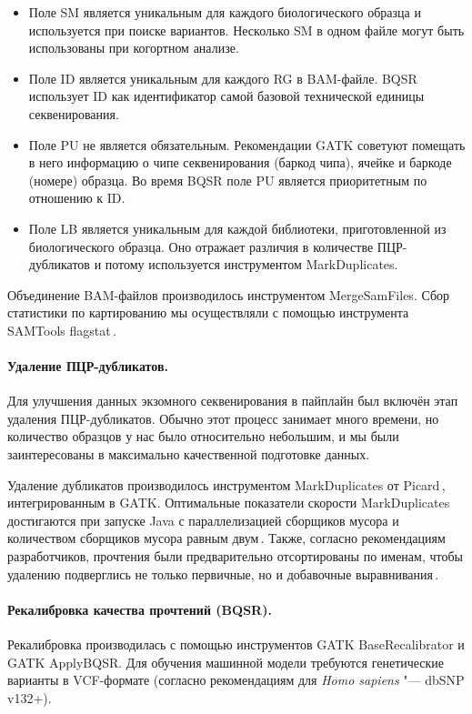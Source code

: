 \documentclass[a4paper,14pt]{extarticle}
\newcommand{\utilname}[1]{\textenglish{#1}}
\newcommand{\ecitep}[1]{\textenglish{\citep{#1}}}
\begin{document}
\begin{itemize}
	\item Поле SM является уникальным для каждого биологического образца и используется при поиске вариантов.
	 Несколько SM в одном файле могут быть использованы при когортном анализе.
	\item Поле ID является уникальным для каждого RG в BAM-файле.
	 BQSR использует ID как идентификатор самой базовой технической единицы секвенирования.
	\item Поле PU не является обязательным.
	 Рекомендации GATK советуют помещать в него информацию о чипе секвенирования (баркод чипа), ячейке и баркоде (номере) образца.
	 Во время BQSR поле PU является приоритетным по отношению к ID.
	\item Поле LB является уникальным для каждой библиотеки, приготовленной из биологического образца.
	 Оно отражает различия в количестве ПЦР\hyp{}дубликатов и потому используется инструментом \utilname{MarkDuplicates}.
\end{itemize}

Объединение BAM-файлов производилось инструментом \utilname{MergeSamFiles}.
Сбор статистики по картированию мы осуществляли с помощью инструмента \utilname{SAMTools flagstat}\,\ecitep{Li_2009_SAMTools}.

\paragraph{Удаление ПЦР\hyp{}дубликатов.}
Для улучшения данных экзомного секвенирования в пайплайн был включён этап удаления ПЦР\hyp{}дубликатов.
Обычно этот процесс занимает много времени, но количество образцов у нас было относительно небольшим, и мы были заинтересованы в максимально качественной подготовке данных.

Удаление дубликатов производилось инструментом \utilname{MarkDuplicates} от Picard\,\ecitep{PicardTools}, интегрированным в \utilname{GATK}.
Оптимальные показатели скорости \utilname{MarkDuplicates} достигаются при запуске \utilname{Java} с параллелизацией сборщиков мусора и количеством сборщиков мусора равным двум\,\ecitep{Heldenbrand_2019}.
Также, согласно рекомендациям разработчиков, прочтения были предварительно отсортированы по именам, чтобы удалению подверглись не только первичные, но и добавочные выравнивания\,\ecitep{Auwera_2013}.

\paragraph{Рекалибровка качества прочтений (BQSR).}
Рекалибровка производилась с помощью инструментов \utilname{GATK BaseRecalibrator} и \utilname{GATK ApplyBQSR}.
Для обучения машинной модели требуются генетические варианты в VCF-формате (согласно рекомендациям для \textit{Homo sapiens} "--- dbSNP v132+).
\end{document}
